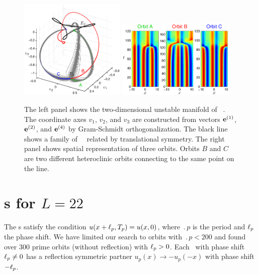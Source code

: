 \begin{figure}[t]
\begin{center}
\includegraphics[width=0.45\textwidth]{figs/ks22_E3_manifold.eps}
\includegraphics[width=0.5\textwidth]{figs/ks22_E3_orbits_c.eps}
\end{center}
\caption{
The left panel shows the two-dimensional
unstable manifold of \eqv\ . The coordinate axes
$v_1$, $v_2$, and $v_3$ are constructed from vectors
${\mathbf e}^{(1)}$, ${\mathbf e}^{(2)}$, and ${\mathbf e}^{(4)}$ by Gram-Schmidt orthogonalization.
The black line shows a family of ~\eqva\ related by translational
symmetry. The right panel shows spatial representation of
three orbits. Orbits $B$ and $C$ are two different heteroclinic orbits
connecting  to the same point on the  line.
        }
\label{f:KS22E3man}
\end{figure}


\section{\Rpo s for $L=22$}
\label{sec:rpos}

The \rpo s satisfy the condition  
$u(x+\ell_p,{T_{p}}) = u(x,0)$,
where $\period{p}$ is the period and $\ell_p$ the phase shift.
We have limited our search to orbits with $\period{p} < 200$ and found
over 300 prime orbits (without reflection) with $\ell_p > 0$.  
Each \rpo\ with phase shift
$\ell_p \neq 0$ has a reflection symmetric partner
$u_p(x) \to -u_p(-x)$ with phase shift $-\ell_p$.  

